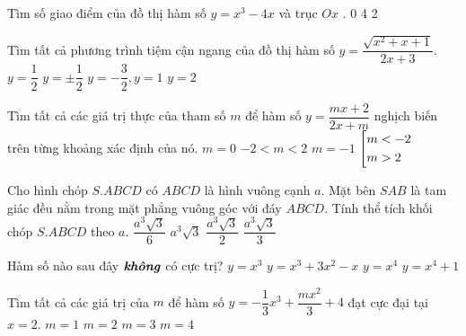 \begin{ex}%
Tìm số giao điểm của đồ thị hàm số $y=x^3-4x$ và trục $Ox$ .
\choice
{0}
{4}
{2}
{}
\end{ex}
\begin{ex}%
Tìm tất cả phương trình tiệm cận ngang của đồ thị hàm số $y=\dfrac{\sqrt{x^2+x+1}}{2x+3}$.
\choice
{$y=\dfrac{1}{2}$}
{\True$y=\pm \dfrac{1}{2}$}
{$y=-\dfrac{3}{2},y=1$}
{$y=2$}
\end{ex}
\begin{ex}%
Tìm tất cả các giá trị thực của tham số $m$ để hàm số $y=\dfrac{mx+2}{2x+m}$ nghịch biến trên từng khoảng xác định của nó.
\choice
{$m=0$}
{\True $-2<m<2$}
{$m=-1$}
{$\left[\begin{aligned}&m<-2\\&m>2\end{aligned}\right.$}
\end{ex}
\begin{ex}%
Cho hình chóp $S.ABCD$ có $ABCD$ là hình vuông cạnh $a$. Mặt bên $SAB$ là tam giác đều nằm trong mặt phẳng vuông góc với đáy $ABCD$. Tính thể tích khối chóp $S.ABCD$ theo $a$.
\choice
{\True $\dfrac{a^3\sqrt{3}}{6}$}
{$a^3\sqrt{3}$}
{$\dfrac{a^3\sqrt{3}}{2}$}
{$\dfrac{a^3\sqrt{3}}{3}$}
\end{ex}
\begin{ex}%
Hàm số nào sau đây $\textbf{\textit{không}}$ có cực trị?
\choice
{$y=x^3$}
{\True $y=x^3+3x^2-x$}
{$y=x^4$}
{$y=x^4+1$}
\end{ex}
\begin{ex}%
Tìm tất cả các giá trị của $m$ để hàm số $y=-\dfrac{1}{3}x^3+\dfrac{mx^2}{3}+4$ đạt cực đại tại $x=2$.
\choice
{$m=1$}
{$m=2$}
{\True $m=3$}
{$m=4$}
\end{ex}
